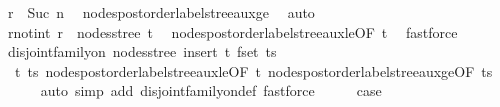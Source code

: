 \begin{isabellebody}
\ {\isachardoublequoteopen}r\ {\isasymge}\ Suc\ n{\isacharprime}{\kern0pt}{\isachardoublequoteclose}\ \isamarkupfalse%
\ nodes{\isacharunderscore}{\kern0pt}postorder{\isacharunderscore}{\kern0pt}label{\isacharunderscore}{\kern0pt}stree{\isacharunderscore}{\kern0pt}aux{\isacharunderscore}{\kern0pt}ge\ \isamarkupfalse%
\ auto\isanewline
\ \ \isamarkupfalse%
\ \isamarkupfalse%
\ r{\isacharunderscore}{\kern0pt}notin{\isacharunderscore}{\kern0pt}t{\isacharprime}{\kern0pt}{\isacharcolon}{\kern0pt}\ {\isachardoublequoteopen}r\ {\isasymnotin}\ nodes{\isacharunderscore}{\kern0pt}stree\ t{\isacharprime}{\kern0pt}{\isachardoublequoteclose}\ \isamarkupfalse%
\ nodes{\isacharunderscore}{\kern0pt}postorder{\isacharunderscore}{\kern0pt}label{\isacharunderscore}{\kern0pt}stree{\isacharunderscore}{\kern0pt}aux{\isacharunderscore}{\kern0pt}le{\isacharbrackleft}{\kern0pt}OF\ t{\isacharprime}{\kern0pt}{\isacharbrackright}{\kern0pt}\ \isamarkupfalse%
\ fastforce\isanewline
\ \ \isamarkupfalse%
\ {\isachardoublequoteopen}disjoint{\isacharunderscore}{\kern0pt}family{\isacharunderscore}{\kern0pt}on\ nodes{\isacharunderscore}{\kern0pt}stree\ {\isacharparenleft}{\kern0pt}insert\ t{\isacharprime}{\kern0pt}\ {\isacharparenleft}{\kern0pt}fset\ ts{\isacharprime}{\kern0pt}{\isacharparenright}{\kern0pt}{\isacharparenright}{\kern0pt}{\isachardoublequoteclose}\isanewline
\ \ \ \ \isamarkupfalse%
\ {}\ t{\isacharprime}{\kern0pt}\ ts{\isacharprime}{\kern0pt}\ nodes{\isacharunderscore}{\kern0pt}postorder{\isacharunderscore}{\kern0pt}label{\isacharunderscore}{\kern0pt}stree{\isacharunderscore}{\kern0pt}aux{\isacharunderscore}{\kern0pt}le{\isacharbrackleft}{\kern0pt}OF\ t{\isacharprime}{\kern0pt}{\isacharbrackright}{\kern0pt}\ nodes{\isacharunderscore}{\kern0pt}postorder{\isacharunderscore}{\kern0pt}label{\isacharunderscore}{\kern0pt}stree{\isacharunderscore}{\kern0pt}aux{\isacharunderscore}{\kern0pt}ge{\isacharbrackleft}{\kern0pt}OF\ ts{\isacharprime}{\kern0pt}{\isacharbrackright}{\kern0pt}\isanewline
\ \ \ \ \isamarkupfalse%
\ {\isacharparenleft}{\kern0pt}auto\ simp\ add{\isacharcolon}{\kern0pt}\ disjoint{\isacharunderscore}{\kern0pt}family{\isacharunderscore}{\kern0pt}on{\isacharunderscore}{\kern0pt}def{\isacharcomma}{\kern0pt}\ fastforce{\isacharplus}{\kern0pt}{\isacharparenright}{\kern0pt}\isanewline
\ \ \isamarkupfalse%
\ \isamarkupfalse%
\ {\isacharquery}{\kern0pt}case\ \isamarkupfalse%

\end{isabellebody}
